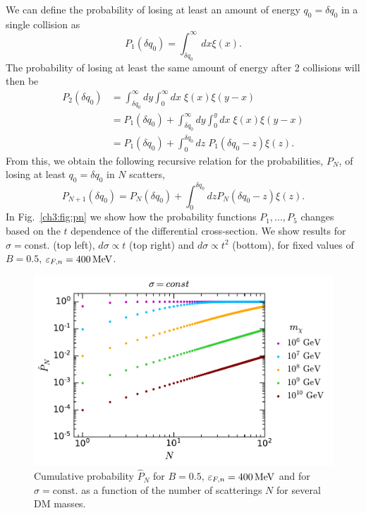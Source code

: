 We can define the probability of losing at least an amount of energy $q_0 = \delta q_0$ in a single collision as
\begin{equation}
    P_1(\delta q_0) = \int_{\delta q_0}^\infty dx \xi(x).
    \label{ch3:eq:P1}
\end{equation}
The probability of losing at least the same amount of energy after 2 collisions will then be
\begin{align}
 P_2(\delta q_0) &= \int_{\delta q_0}^\infty dy \int_0^\infty dx\;\xi(x) \xi(y-x)\\
    & =  P_1(\delta q_0) + \int_{\delta q_0}^\infty dy \int_0^y dx\; \xi(x)\xi(y-x)\\
    & = P_1(\delta q_0) + \int_0^{\delta q_0} dz \;P_1(\delta q_0-z)\xi(z).
\end{align}
From this, we obtain the following recursive relation for the probabilities, $P_N$, of losing at least $q_0 = \delta q_0$ in $N$ scatters,
\begin{equation}
 P_{N+1}(\delta q_0) = P_N(\delta q_0) + \int_0^{\delta q_0} dz P_N(\delta q_0-z)\xi(z).\label{ch3:eq:pnrecurrent}
\end{equation} 
In Fig.~\ref{ch3:fig:pn} we show how the probability functions $P_1,...,P_5$ changes based on the $t$ dependence of the differential cross-section. We show results for $\sigma=$const. (top left), $d\sigma\propto t$ (top right) and $d\sigma\propto t^2$ (bottom), for fixed values of $B=0.5$, $\varepsilon_{F,n}=400{\rm \,MeV}$.

\begin{figure}
    \centering
    \includegraphics[width=.6\textwidth]{capture_1/cumprobN_n0.pdf}
    \caption{Cumulative probability $\hat{P}_N$ for $B=0.5$,  $\varepsilon_{F,n}=400{\rm \,MeV}$ and for $\sigma = \mathrm{const.}$ as a function of the number of scatterings $N$ for several DM masses.}
    \label{ch3:fig:pnofn}
\end{figure}

